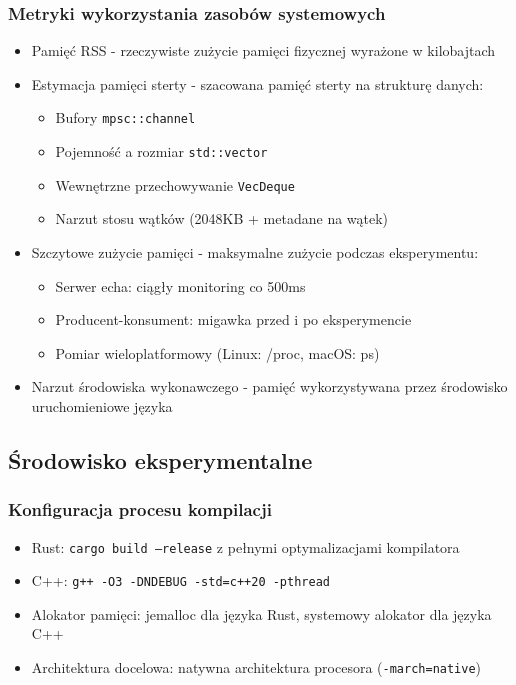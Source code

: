 \subsubsection{Metryki wykorzystania zasobów systemowych}
\begin{itemize}
    \item Pamięć RSS  - rzeczywiste zużycie pamięci fizycznej wyrażone w kilobajtach
    \item Estymacja pamięci sterty - szacowana pamięć sterty na strukturę danych:
    \begin{itemize}
        \item Bufory \texttt{mpsc::channel}
        \item Pojemność a rozmiar \texttt{std::vector}
        \item Wewnętrzne przechowywanie \texttt{VecDeque}
        \item Narzut stosu wątków (2048KB + metadane na wątek)
    \end{itemize}
    \item Szczytowe zużycie pamięci - maksymalne zużycie podczas eksperymentu:
    \begin{itemize}
        \item Serwer echa: ciągły monitoring co 500ms
        \item Producent-konsument: migawka przed i po eksperymencie
        \item Pomiar wieloplatformowy (Linux: /proc, macOS: ps)
    \end{itemize}
    \item Narzut środowiska wykonawczego - pamięć wykorzystywana przez środowisko uruchomieniowe języka
\end{itemize}

\subsection{Środowisko eksperymentalne}

\subsubsection{Konfiguracja procesu kompilacji}
\begin{itemize}
    \item Rust: \texttt{cargo build --release} z pełnymi optymalizacjami kompilatora
    \item C++: \texttt{g++ -O3 -DNDEBUG -std=c++20 -pthread}
    \item Alokator pamięci: jemalloc dla języka Rust, systemowy alokator dla języka C++
    \item Architektura docelowa: natywna architektura procesora (\texttt{-march=native})
\end{itemize}

